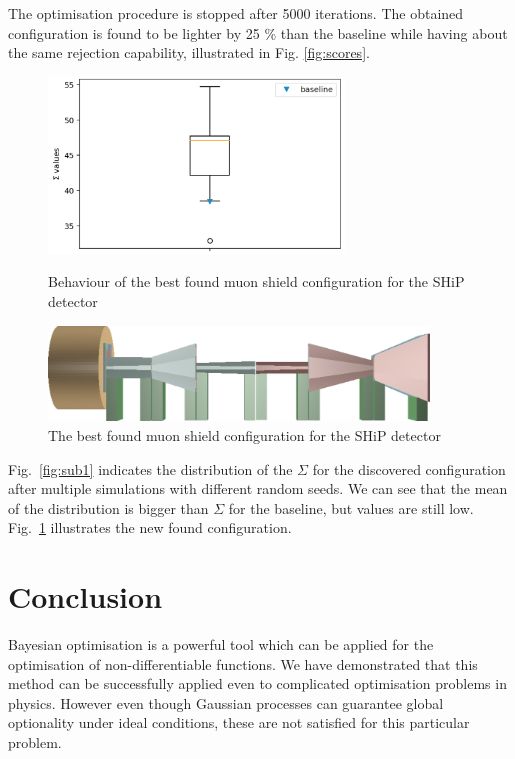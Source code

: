 \documentclass[a4paper]{jpconf}
\theoremstyle{my_theorem_style}
\numberwithin{equation}{section}
\begin{document}
The optimisation procedure is stopped after 5000 iterations. 
The obtained configuration is found to be lighter by 25 \% than the
baseline while having about  the same rejection capability, illustrated in
Fig. \ref{fig:scores}.

\begin{figure}[H]
\centering
\begin{minipage}[c]{0.45\textwidth}
\includegraphics[width=0.7\textwidth]{pics/solution}
 \caption{\label{fig:sub1} Behaviour of the best found muon shield configuration
   for the SHiP detector}
 \end{minipage}
\begin{minipage}[c]{0.45\textwidth}
  \includegraphics[width=0.9\textwidth]{pics/sol_2.png}
  \caption{\label{fig:sub2} The best found muon shield configuration
   for the SHiP detector}
\end{minipage}  
\end{figure}

Fig.~\ref{fig:sub1} indicates the distribution of the $\Sigma$ for the
discovered configuration after multiple simulations with different
random seeds. We can see that the mean of the distribution is bigger
than $\Sigma$ for the baseline, but values are still low.  Fig.~\ref{fig:sub2} illustrates the new found configuration.

\section{Conclusion}

Bayesian optimisation is a powerful tool which can be applied for the
optimisation of non-differentiable functions. We have demonstrated
that this method can be successfully applied even to 
complicated optimisation problems in physics. 
However even though Gaussian processes can guarantee global optionality under ideal
conditions,  these are not satisfied for this particular problem.
\end{document}

